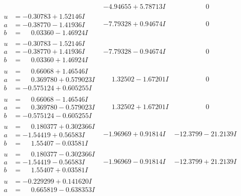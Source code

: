 \documentclass[1p]{elsarticle_modified}
\theoremstyle{definition}
\begin{document}
$$\begin{array}{c|c|c}
 & -4.94655 + 5.78713 I & \phantom{-0.000000 } 0 \\ \hline\begin{aligned}
u &= -0.30783 + 1.52146 I \\
a &= -0.38770 - 1.41936 I \\
b &= \phantom{-}0.03360 - 1.46924 I\end{aligned}
 & -7.79328 + 0.94674 I & \phantom{-0.000000 } 0 \\ \hline\begin{aligned}
u &= -0.30783 - 1.52146 I \\
a &= -0.38770 + 1.41936 I \\
b &= \phantom{-}0.03360 + 1.46924 I\end{aligned}
 & -7.79328 - 0.94674 I & \phantom{-0.000000 } 0 \\ \hline\begin{aligned}
u &= \phantom{-}0.66068 + 1.46546 I \\
a &= \phantom{-}0.369780 + 0.579023 I \\
b &= -0.575124 + 0.605255 I\end{aligned}
 & \phantom{-}1.32502 - 1.67201 I & \phantom{-0.000000 } 0 \\ \hline\begin{aligned}
u &= \phantom{-}0.66068 - 1.46546 I \\
a &= \phantom{-}0.369780 - 0.579023 I \\
b &= -0.575124 - 0.605255 I\end{aligned}
 & \phantom{-}1.32502 + 1.67201 I & \phantom{-0.000000 } 0 \\ \hline\begin{aligned}
u &= \phantom{-}0.180377 + 0.302366 I \\
a &= -1.54419 + 0.56583 I \\
b &= \phantom{-}1.55407 - 0.03581 I\end{aligned}
 & -1.96969 + 0.91814 I & -12.3799 - 21.2139 I \\ \hline\begin{aligned}
u &= \phantom{-}0.180377 - 0.302366 I \\
a &= -1.54419 - 0.56583 I \\
b &= \phantom{-}1.55407 + 0.03581 I\end{aligned}
 & -1.96969 - 0.91814 I & -12.3799 + 21.2139 I \\ \hline\begin{aligned}
u &= -0.229299 + 0.141620 I \\
a &= \phantom{-}0.665819 - 0.638353 I \\

\end{aligned}
\end{array}$$
\end{document}

